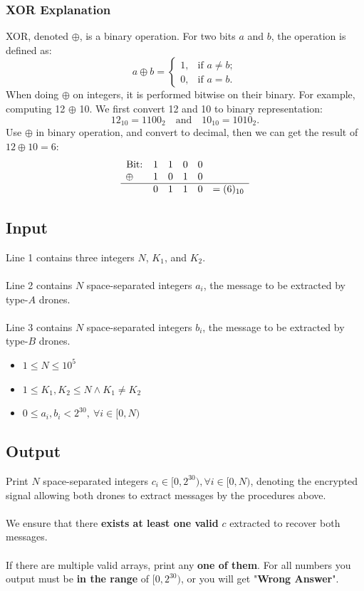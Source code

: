\documentclass[12pt,a4paper]{article}
\begin{document}
\subsubsection*{\fontsize{14}{12}XOR Explanation}
XOR, denoted $\oplus$, is a binary operation. For two bits $a$ and $b$, the operation is defined as:
    \[
    a \oplus b =
    \begin{cases}
    1, & \text{if } a \neq b; \\
    0, & \text{if } a = b.
    \end{cases}
    \]
\noindent
When doing $\oplus$ on integers, it is performed bitwise on their binary.
For example, computing 12 $\oplus$ 10.
We first convert 12 and 10 to binary representation:
\[
12_{10} = 1100_2 \quad \text{and} \quad 10_{10} = 1010_2.
\]
\noindent
Use $\oplus$ in binary operation, and convert to decimal, then we can get the result of $12\oplus10=6$:
\[
\begin{array}{cccccc}
\text{Bit:} & 1 & 1 & 0 & 0 \\
\oplus \quad & 1 & 0 & 1 & 0 \\
\hline&0&1&1&0&=(6)_{10}\\
\end{array}
\]


\subsection*{\fontsize{16}{12}Input}
Line 1 contains three integers $N$, $K_1$, and $K_2$.
\\\\
\noindent
Line 2 contains $N$ space-separated integers $a_i$, the message to be extracted by type-$A$ drones.
\\\\
\noindent
Line 3 contains $N$ space-separated integers $b_i$, the message to be extracted by type-$B$ drones.

\begin{itemize}
    \item $1 \leq N \leq 10^5$
    \item $1 \leq K_1, K_2 \leq N\wedge K_1 \ne K_2$
    \item $0 \leq a_i, b_i < 2^{30},\ \forall i\in [0,N)$
\end{itemize}

\subsection*{\fontsize{16}{12}Output}
Print $N$ space-separated integers $c_i\in [0,2^{30}),\forall i\in [0,N)$, denoting the encrypted signal allowing both drones to extract messages by the procedures above.\\\\\noindent
We ensure that there \textbf{exists at least one valid} $c$ extracted to recover both messages.
\\\\
\noindent
If there are multiple valid arrays, print any \textbf{one of them}. For all numbers you output must be \textbf{in the range} of $[0, 2^{30})$, or you will get "\textbf{Wrong Answer}".
\end{document}

